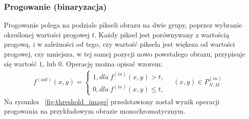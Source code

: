 \subsubsection{Progowanie (binaryzacja)} \label{sssec:threshold}
Progowanie polega na podziale pikseli obrazu na dwie grupy, poprzez wybranie określonej wartości progowej $t$. Każdy piksel jest porównywany z wartością progową, i w zależności od tego, czy wartość piksela jest większa od wartości progowej, czy mniejsza, w tej samej pozycji nowo powstałego obrazu, przypisuje się wartość $1$, lub $0$. Operację można opisać wzorem:
\begin{gather*}
  f^{(out)}(x, y) = \left\{\begin{matrix}
  1, dla \: f^{(in)}(x, y) > t,\\
  0, dla \: f^{(in)}(x, y) \leq t,
  \end{matrix}\right. \quad (x, y) \in P^{(in)}_{N,M}
\end{gather*}
Na rysunku ~\ref{fig:threshold_image} przedstawiony został wynik operacji progowania na przykładowym obrazie monochromatycznym.
